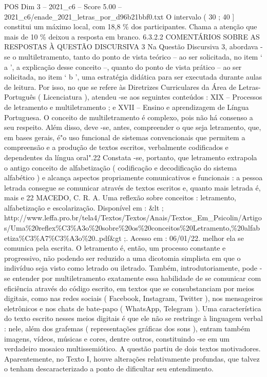 \begin{textsample}{POS Dim 3 – 2021\_c6 – Score 5.00 – 2021\_c6/enade\_2021\_letras\_por\_d96b21bbf0.txt}
O intervalo ( 30 ; 40 ] constitui um máximo local, com 18,8 \% dos participantes.
Chama a atenção que mais de 10 \% deixou a resposta em branco. 6.3.2.2 COMENTÁRIOS SOBRE AS RESPOSTAS À QUESTÃO DISCURSIVA 3 Na Questão Discursiva 3, abordava -se o multiletramento, tanto do ponto de vista teórico – ao ser solicitada, no item ‘ a ’, a explicação desse conceito –, quanto do ponto de vista prático – ao ser solicitada, no item ‘ b ’, uma estratégia didática para ser executada durante aulas de leitura.
Por isso, no que se refere às Diretrizes Curriculares da Área de Letras-Português ( Licenciatura ), atendeu -se aos seguintes conteúdos : XIX – Processos de letramento e multiletramento ; e XVII – Ensino e aprendizagem de Língua Portuguesa.
O conceito de multiletramento é complexo, pois não há consenso a seu respeito.
Além disso, deve -se, antes, compreender o que seja letramento, que, em bases gerais, é"o uso funcional de sistemas convencionais que permitem a compreensão e a produção de textos escritos, verbalmente codificados e dependentes da língua oral".22 Constata -se, portanto, que letramento extrapola o antigo conceito de alfabetização ( codificação e decodificação do sistema alfabético ) e alcança aspectos propriamente comunicativos e funcionais : a pessoa letrada consegue se comunicar através de textos escritos e, quanto mais letrada é, mais e 22 MACEDO, C.
R.
A.
Uma reflexão sobre conceitos : letramento, alfabetização e escolarização.
Disponível em : \&lt ; http://www.leffa.pro.br/tela4/Textos/Textos/Anais/Textos\_Em\_Psicolin/Artigos/Uma\%20reflex\%C3\%A3o\%20sobre\%20os\%20conceitos\%20Letramento,\%20alfabetiza\%C3\%A7\%C3\%A3o\%20..pdf\&gt ;.
Acesso em : 06/01/22. melhor ela se comunica pela escrita.
O letramento é, então, um processo constante e progressivo, não podendo ser reduzido a uma dicotomia simplista em que o indivíduo seja visto como letrado ou iletrado.
Também, introdutoriamente, pode -se entender por multiletramento exatamente essa habilidade de se comunicar com eficiência através do código escrito, em textos que se consubstanciam por meios digitais, como nas redes sociais ( Facebook, Instagram, Twitter ), nos mensageiros eletrônicos e nos chats de bate-papo ( WhatsApp, Telegram ).
Uma característica do texto escrito nesses meios digitais é que ele não se restringe à linguagem verbal : nele, além dos grafemas ( representações gráficas dos sons ), entram também imagens, vídeos, músicas e cores, dentre outros, constituindo -se em um verdadeiro mosaico multissemiótico.
A questão partiu de dois textos motivadores.
Aparentemente, no Texto I, houve alterações relativamente profundas, que talvez o tenham descaracterizado a ponto de dificultar seu entendimento.

\end{textsample}
